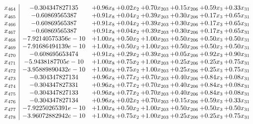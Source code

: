 \documentclass[8pt]{article}
\begin{document}
\[\begin{array}{c| c c@{\hskip 2pt} c@{\hskip 2pt} c@{\hskip 2pt} c@{\hskip 2pt} c@{\hskip 2pt} c@{\hskip 2pt} }
 x_{464}   &  -0.304347827135 & +  0.96 x_{8} & +  0.02 x_{2} & +  0.70 x_{203} & +  0.15 x_{206} & +  0.59 x_{3} & +  0.33 x_{31}\\
 x_{465}   &  -0.60869565387 & +  0.91 x_{8} & +  0.04 x_{2} & +  0.39 x_{203} & +  0.30 x_{206} & +  0.17 x_{3} & +  0.65 x_{31}\\
 x_{466}   &  -0.60869565387 & +  0.91 x_{8} & +  0.04 x_{2} & +  0.39 x_{203} & +  0.30 x_{206} & +  0.17 x_{3} & +  0.65 x_{31}\\
 x_{467}   &  -0.60869565387 & +  0.91 x_{8} & +  0.04 x_{2} & +  0.39 x_{203} & +  0.30 x_{206} & +  0.17 x_{3} & +  0.65 x_{31}\\
 x_{468}   &  -7.92140575356e-10 & +  1.00 x_{8} & +  0.50 x_{2} & +  1.00 x_{203} & +  0.50 x_{206} & +  0.50 x_{3} & +  0.50 x_{31}\\
 x_{469}   &  -7.91686494139e-10 & +  1.00 x_{8} & +  0.50 x_{2} & +  1.00 x_{203} & +  0.50 x_{206} & +  0.50 x_{3} & +  0.50 x_{31}\\
 x_{470}   &  -0.608695653474 & +  0.91 x_{8} & +  0.29 x_{2} & +  0.39 x_{203} & +  0.05 x_{206} & +  0.92 x_{3} & +  0.90 x_{31}\\
 x_{471}   &  -5.9438187705e-10 & +  1.00 x_{8} & +  0.75 x_{2} & +  1.00 x_{203} & +  0.25 x_{206} & +  0.25 x_{3} & +  0.75 x_{31}\\
 x_{472}   &  -3.95889890432e-10 & +  1.00 x_{8} & +  0.75 x_{2} & +  1.00 x_{203} & +  0.25 x_{206} & +  0.25 x_{3} & +  0.75 x_{31}\\
 x_{473}   &  -0.304347827134 & +  0.96 x_{8} & +  0.77 x_{2} & +  0.70 x_{203} & +  0.40 x_{206} & +  0.84 x_{3} & +  0.08 x_{31}\\
 x_{474}   &  -0.304347827331 & +  0.96 x_{8} & +  0.77 x_{2} & +  0.70 x_{203} & +  0.40 x_{206} & +  0.84 x_{3} & +  0.08 x_{31}\\
 x_{475}   &  -0.304347827133 & +  0.96 x_{8} & +  0.77 x_{2} & +  0.70 x_{203} & +  0.40 x_{206} & +  0.84 x_{3} & +  0.08 x_{31}\\
 x_{476}   &  -0.304347827134 & +  0.96 x_{8} & +  0.02 x_{2} & +  0.70 x_{203} & +  0.15 x_{206} & +  0.59 x_{3} & +  0.33 x_{31}\\
 x_{477}   &  -7.92250265391e-10 & +  1.00 x_{8} & +  0.50 x_{2} & +  1.00 x_{203} & +  0.50 x_{206} & +  0.50 x_{3} & +  0.50 x_{31}\\
 x_{478}   &  -3.96072882942e-10 & +  1.00 x_{8} & +  0.75 x_{2} & +  1.00 x_{203} & +  0.25 x_{206} & +  0.25 x_{3} & +  0.75 x_{31}\\

\end{array}\]
\end{document}
